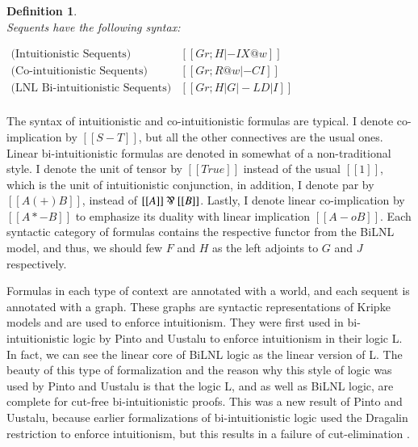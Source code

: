 \documentclass{lmcs}
\newtheorem{definition}[theorem]{Definition}
\begin{document}
\begin{definition}
  \ \\
  \noindent
  Sequents have the following syntax:
  \begin{center}
    \begin{math}
      \begin{array}{rll}
        \text{(Intuitionistic Sequents)}   & [[Gr;H |-I X@w]]\\
        \text{(Co-intuitionistic Sequents)} & [[Gr;R@w |-C I]]\\
        \text{(LNL Bi-intuitionistic Sequents)} & [[Gr;H | G |-L D | I]]\\
      \end{array}
    \end{math}
  \end{center}
\end{definition}

The syntax of intuitionistic and co-intuitionistic formulas are
typical.  I denote co-implication by $[[S - T]]$, but all the other
connectives are the usual ones. Linear bi-intuitionistic formulas are
denoted in somewhat of a non-traditional style. I denote the unit of
tensor by $[[True]]$ instead of the usual $[[1]]$, which is the unit
of intuitionistic conjunction, in addition, I denote par by $[[A (+)
    B]]$, instead of $[[A]] \parr [[B]]$.  Lastly, I denote linear
co-implication by $[[A *- B]]$ to emphasize its duality with linear
implication $[[A -o B]]$.  Each syntactic category of formulas
contains the respective functor from the BiLNL model, and thus, we
should few $F$ and $H$ as the left adjoints to $G$ and $J$
respectively.

Formulas in each type of context are annotated with a world, and each
sequent is annotated with a graph.  These graphs are syntactic
representations of Kripke models and are used to enforce intuitionism.
They were first used in bi-intuitionistic logic by Pinto and Uustalu
\cite{Pinto:2009} to enforce intuitionism in their logic L.  In fact,
we can see the linear core of BiLNL logic as the linear version of L.
The beauty of this type of formalization and the reason why this style
of logic was used by Pinto and Uustalu is that the logic L, and as
well as BiLNL logic, are complete for cut-free bi-intuitionistic
proofs.  This was a new result of Pinto and Uustalu, because earlier
formalizations of bi-intuitionistic logic \cite{Crolard:2001} used the
Dragalin restriction \cite{Dragalin:1988} to enforce intuitionism, but
this results in a failure of cut-elimination
\cite{Schellinx:1991,Pinto:2009}.
\end{document}
